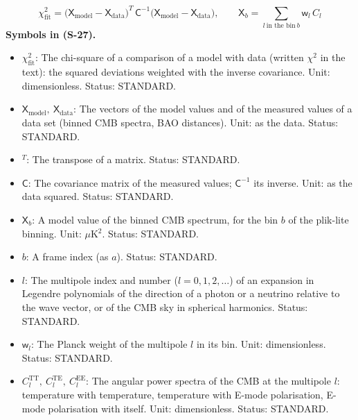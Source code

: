 \documentclass[
  10pt,
]{article}
\providecommand{\tightlist}{%
  \setlength{\itemsep}{0pt}\setlength{\parskip}{0pt}}
\begin{document}
\[
\chi_{\mathrm{fit}}^2 = \big(\mathsf{X}_{\mathrm{model}} - \mathsf{X}_{\mathrm{data}}\big)^T\,\mathsf{C}^{-1}\big(\mathsf{X}_{\mathrm{model}} - \mathsf{X}_{\mathrm{data}}\big),\qquad
\mathsf{X}_b = \sum_{l\ \text{in the bin}\ b}\mathsf{w}_{l}\,C_l \tag{S-27}
\] \textbf{Symbols in (S-27).}

\begin{itemize}
\tightlist
\item
  \(\chi_{\mathrm{fit}}^2\): The chi-square of a comparison of a model
  with data (written \(\chi^2\) in the text): the squared deviations
  weighted with the inverse covariance. Unit: dimensionless. Status:
  STANDARD.
\item
  \(\mathsf{X}_{\mathrm{model}},\ \mathsf{X}_{\mathrm{data}}\): The
  vectors of the model values and of the measured values of a data set
  (binned CMB spectra, BAO distances). Unit: as the data. Status:
  STANDARD.
\item
  \({}^T\): The transpose of a matrix. Status: STANDARD.
\item
  \(\mathsf{C}\): The covariance matrix of the measured values;
  \(\mathsf{C}^{-1}\) its inverse. Unit: as the data squared. Status:
  STANDARD.
\item
  \(\mathsf{X}_b\): A model value of the binned CMB spectrum, for the
  bin \(b\) of the plik-lite binning. Unit: \(\mu\)K\(^2\). Status:
  STANDARD.
\item
  \(b\): A frame index (as \(a\)). Status: STANDARD.
\item
  \(l\): The multipole index and number (\(l = 0, 1, 2, \dots\)) of an
  expansion in Legendre polynomials of the direction of a photon or a
  neutrino relative to the wave vector, or of the CMB sky in spherical
  harmonics. Status: STANDARD.
\item
  \(\mathsf{w}_l\): The Planck weight of the multipole \(l\) in its bin.
  Unit: dimensionless. Status: STANDARD.
\item
  \(C_l^{\mathrm{TT}},\ C_l^{\mathrm{TE}},\ C_l^{\mathrm{EE}}\): The
  angular power spectra of the CMB at the multipole \(l\): temperature
  with temperature, temperature with E-mode polarisation, E-mode
  polarisation with itself. Unit: dimensionless. Status: STANDARD.
\end{itemize}
\end{document}
